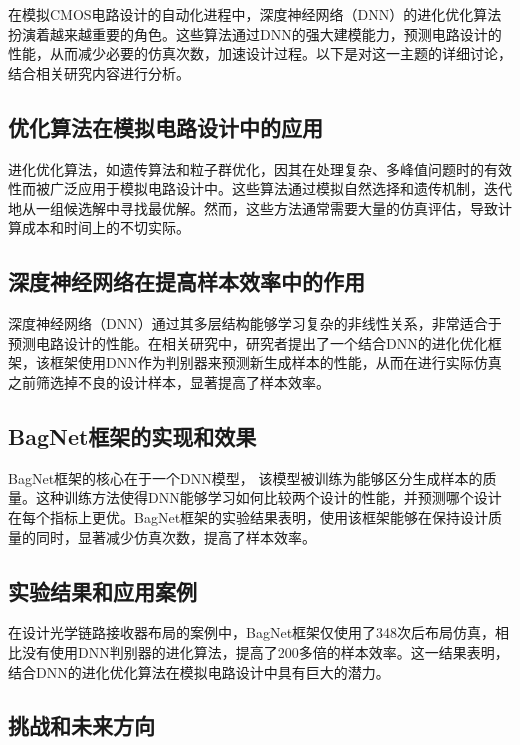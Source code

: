 在模拟CMOS电路设计的自动化进程中，深度神经网络（DNN）的进化优化算法扮演着越来越重要的角色。这些算法通过DNN的强大建模能力，预测电路设计的性能，从而减少必要的仿真次数，加速设计过程。以下是对这一主题的详细讨论，结合相关研究内容进行分析。\cite{8942062}

\subsection{优化算法在模拟电路设计中的应用}

进化优化算法，如遗传算法和粒子群优化，因其在处理复杂、多峰值问题时的有效性而被广泛应用于模拟电路设计中。这些算法通过模拟自然选择和遗传机制，迭代地从一组候选解中寻找最优解。然而，这些方法通常需要大量的仿真评估，导致计算成本和时间上的不切实际。\cite{8904889}

\subsection{深度神经网络在提高样本效率中的作用}

深度神经网络（DNN）通过其多层结构能够学习复杂的非线性关系，非常适合于预测电路设计的性能。在相关研究中，研究者提出了一个结合DNN的进化优化框架，该框架使用DNN作为判别器来预测新生成样本的性能，从而在进行实际仿真之前筛选掉不良的设计样本，显著提高了样本效率。\cite{8005220}

\subsection{BagNet框架的实现和效果}

BagNet框架的核心在于一个DNN模型，\cite{xu2020autodnnchip} 该模型被训练为能够区分生成样本的质量。这种训练方法使得DNN能够学习如何比较两个设计的性能，并预测哪个设计在每个指标上更优。BagNet框架的实验结果表明，使用该框架能够在保持设计质量的同时，显著减少仿真次数，提高了样本效率。

\subsection{实验结果和应用案例}

在设计光学链路接收器布局的案例中，BagNet框架仅使用了348次后布局仿真，相比没有使用DNN判别器的进化算法，提高了200多倍的样本效率。这一结果表明，结合DNN的进化优化算法在模拟电路设计中具有巨大的潜力。

\subsection{挑战和未来方向}

